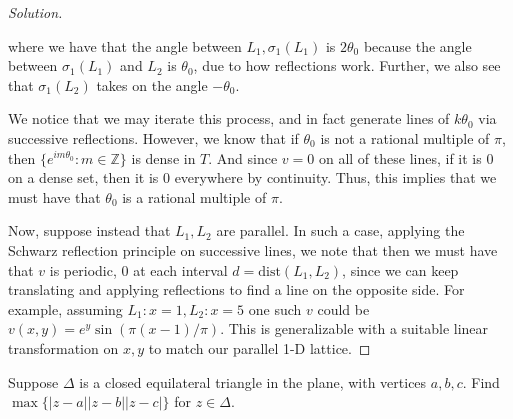 \documentclass[10pt]{article}
\newenvironment{problem}[2][]{\begin{trivlist}
\item[\hskip \labelsep {\bfseries #1}\hskip \labelsep {\bfseries #2.}]}{\end{trivlist}}
\begin{document}
\begin{proof}[Solution]
\begin{figure}[H]
\centering
{}
\end{figure}

where we have that the angle between $L_1, \sigma_1(L_1)$ is $2 \theta_0$ because the angle between $\sigma_1(L_1)$ and $L_2$ is $\theta_0$, due to how reflections work. Further, we also see that $\sigma_1(L_2)$ takes on the angle $- \theta_0$.

We notice that we may iterate this process, and in fact generate lines of $k\theta_0$ via successive reflections. However, we know that if $\theta_0$ is not a rational multiple of $\pi$, then $\{ e^{im\theta_0} :m \in \mathbb{Z} \}$ is dense in $T$. And since $v = 0 $ on all of these lines, if it is $0$ on a dense set, then it is $0$ everywhere by continuity. Thus, this implies that we must have that $\theta_0$ is a rational multiple of $\pi$.

Now, suppose instead that $L_1, L_2$ are parallel. In such a case, applying the Schwarz reflection principle on successive lines, we note that then we must have that $v$ is periodic, $0$ at each interval $d = \text{dist}(L_1, L_2)$, since we can keep translating and applying reflections to find a line on the opposite side. For example, assuming $L_1: x = 1, L_2: x = 5$ one such $v$ could be $v(x,y) = e^{y} \sin(\pi(x-1)/\pi)$. This is generalizable with a suitable linear transformation on $x,y$ to match our parallel 1-D lattice.

\end{proof}

\begin{problem}{Question 2}

Suppose $\Delta$ is a closed equilateral triangle in the plane, with vertices $a,b,c$. Find $\max\{ |z-a||z-b||z-c| \}$ for $z \in \Delta$. 

\end{problem}
\end{document}
